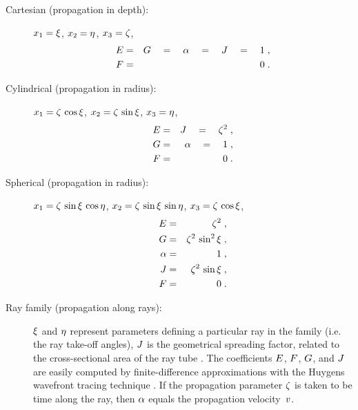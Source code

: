 \begin{description}
\item[Cartesian (propagation in depth):] 
  $x_1=\qx$, $x_2=\qy$, $x_3=\qz$,
  \begin{eqnarray*}
    \EE & = & \GG \quad = \quad \AA \quad = \quad \JJ \quad = \quad 1\;, \\
    \FF & = & 0\;.
  \end{eqnarray*}
\item[Cylindrical (propagation in radius):] 
  $x_1=\qz\,\cos{\qx}$,
  $x_2=\qz\,\sin{\qx}$,
  $x_3=\qy$,
  \begin{eqnarray*}
    \EE & = & \JJ \quad = \quad \qz^2\;, \\
    \GG & = & \AA \quad = \quad 1\;, \\
    \FF & = & 0\;.
  \end{eqnarray*}
\item[Spherical (propagation in radius):] 
  $x_1=\qz\,\sin{\qx}\,\cos{\qy}$,
  $x_2=\qz\,\sin{\qx}\,\sin{\qy}$,
  $x_3=\qz\,\cos{\qx}$,
  \begin{eqnarray*}
    \EE & = & \qz^2\;, \\
    \GG & = & \qz^2\,\sin^2{\qx}\;, \\
    \AA & = & 1\;, \\
    \JJ & = & \qz^2\,\sin{\qx}\;, \\
    \FF & = & 0\;.
  \end{eqnarray*}
\item[Ray family (propagation along rays):] $\qx$ and $\qy$ represent
  parameters defining a particular ray in the family (i.e. the ray take-off
  angles), $\JJ$ is the geometrical spreading factor, related to the
  cross-sectional area of the ray tube \cite[]{cerveny}. The coefficients 
  $\EE$, $\FF$, $\GG$, and $\JJ$ are easily computed by 
  finite-difference approximations
  with the Huygens wavefront tracing technique \cite[]{GEO66-03-08830889}. If
  the propagation parameter $\qz$ is taken to be time along the ray, then
  $\AA$ equals the propagation velocity~$\vv$.
\end{description}


